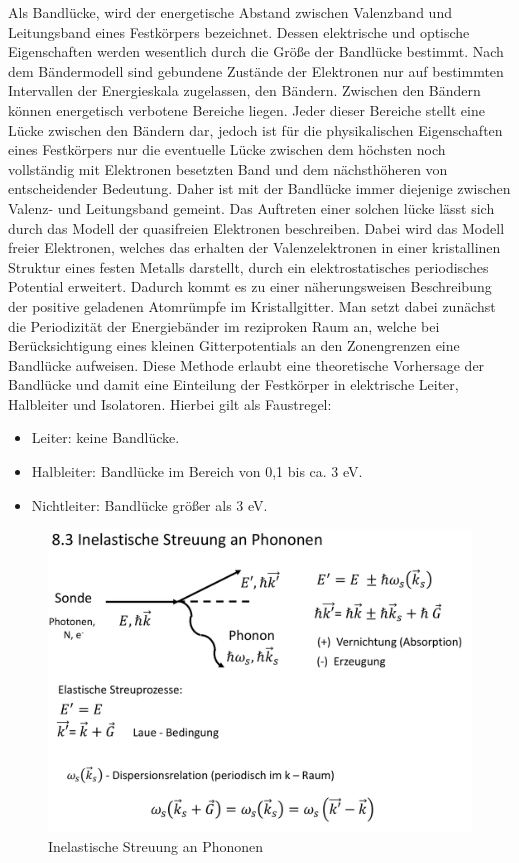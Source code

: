 Als Bandlücke, wird der energetische Abstand zwischen Valenzband und Leitungsband eines Festkörpers bezeichnet. Dessen elektrische und optische Eigenschaften werden wesentlich durch die Größe der Bandlücke bestimmt.
Nach dem Bändermodell sind gebundene Zustände der Elektronen nur auf bestimmten Intervallen der Energieskala zugelassen, den Bändern. Zwischen den Bändern können energetisch verbotene Bereiche liegen. Jeder dieser Bereiche stellt eine Lücke zwischen den Bändern dar, jedoch ist für die physikalischen Eigenschaften eines Festkörpers nur die eventuelle Lücke zwischen dem höchsten noch vollständig mit Elektronen besetzten Band und dem nächsthöheren von entscheidender Bedeutung. Daher ist mit der Bandlücke immer diejenige zwischen Valenz- und Leitungsband gemeint.
Das Auftreten einer solchen lücke lässt sich durch das Modell der quasifreien Elektronen beschreiben. Dabei wird das Modell freier Elektronen, welches das erhalten der Valenzelektronen in einer kristallinen Struktur eines festen Metalls darstellt, durch ein elektrostatisches periodisches Potential
erweitert. Dadurch kommt es zu einer näherungsweisen Beschreibung der positive geladenen Atomrümpfe im Kristallgitter. Man setzt dabei zunächst die Periodizität der Energiebänder im reziproken Raum an, welche bei Berücksichtigung eines kleinen Gitterpotentials an den Zonengrenzen eine Bandlücke aufweisen. 
Diese Methode erlaubt eine theoretische Vorhersage der Bandlücke und damit eine Einteilung der Festkörper in elektrische Leiter, Halbleiter und Isolatoren.
Hierbei gilt als Faustregel:

\begin{itemize}
    \item Leiter: keine Bandlücke.
    \item Halbleiter: Bandlücke im Bereich von 0,1 bis ca. 3 eV.
    \item Nichtleiter: Bandlücke größer als 3 eV.
\end{itemize}

\label{q:6}

\begin{figure}[H]  
    \centering
    \includegraphics[width=.8\textwidth]{resources/05-01-2015/Frage6_1.png}
    \caption{Inelastische Streuung an Phononen}
\end{figure}

